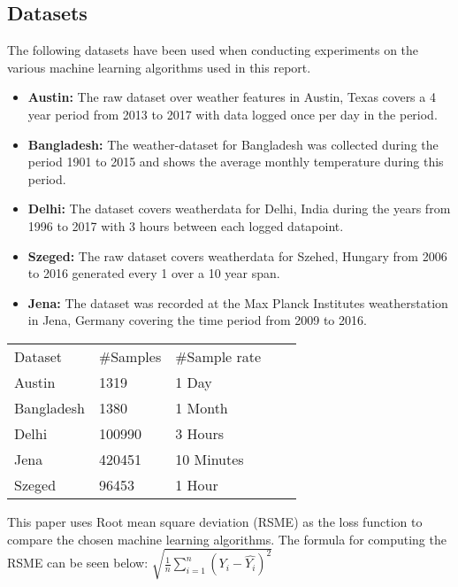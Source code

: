 \label{sec:ExpRes}
\subsection{Datasets}
The following datasets have been used when conducting experiments on the various machine learning algorithms used in this report.
\begin{itemize}
    \item \textbf{Austin:} The raw dataset over weather features in Austin, Texas covers a 4 year period from 2013 to 2017 with data logged once per day in the period.
    \item \textbf{Bangladesh:} The weather-dataset for Bangladesh was collected during the period 1901 to 2015 and shows the average monthly temperature during this period. 
    \item \textbf{Delhi:} The dataset covers weatherdata for Delhi, India during the years from 1996 to 2017 with 3 hours between each logged datapoint.
    \item \textbf{Szeged:} The raw dataset covers weatherdata for Szehed, Hungary from 2006 to 2016 generated every 1 over a 10 year span.
    \item \textbf{Jena:} The dataset was recorded at the Max Planck Institutes weatherstation in Jena, Germany covering the time period from 2009 to 2016.
\end{itemize}

\begin{table}[!ht]
\centering
\begin{tabular}{|l|l|l|ll}
\cline{1-3}
Dataset    & \#Samples & \#Sample rate &  &  \\ \cline{1-3}
Austin     & 1319      & 1 Day         &  &  \\ \cline{1-3}
Bangladesh & 1380      & 1 Month       &  &  \\ \cline{1-3}
Delhi      & 100990    & 3 Hours       &  &  \\ \cline{1-3}
Jena       & 420451    & 10 Minutes    &  &  \\ \cline{1-3}
Szeged     & 96453     & 1 Hour        &  &  \\ \cline{1-3}
\end{tabular}
\end{table}

This paper uses Root mean square deviation (RSME) as the loss function to compare the chosen machine learning algorithms. The formula for computing the RSME can be seen below: 
$\sqrt{\frac 1 n \displaystyle\sum_{i=1}^n(Y_i - \hat{Y_i})^2}$

